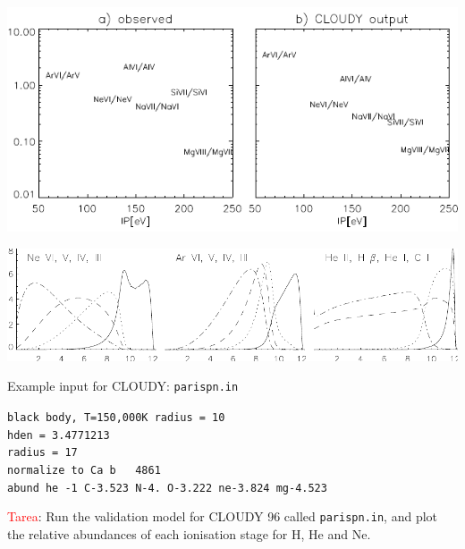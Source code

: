 \foilhead{}

\vspace{4cm}
\begin{center}
  \includegraphics[width=25cm,height=!]{./C/ioncurve.pdf}
\end{center}

\foilhead{}

\vspace{10cm}
\begin{center}
  \includegraphics[width=25cm,height=!]{./C/struct_n6302.pdf}
\end{center}


\foilhead{}

\bgclear
Example input for  CLOUDY: {\tt parispn.in}\\

\medskip
\medskip
\medskip

{\tt black body, T=150,000K radius = 10\\
hden = 3.4771213\\
radius = 17\\
normalize to   Ca b  ~ 4861\\
abund he -1 C-3.523 N-4. O-3.222 ne-3.824 mg-4.523\\ 
}

\medskip

\textcolor{red}{Tarea}: Run the validation model for  CLOUDY 96 called
{\tt parispn.in}, and plot the relative abundances of each ionisation
stage for H, He and Ne. 

\foilhead{}

